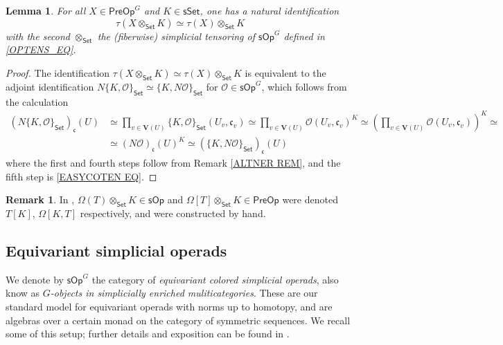 \documentclass[a4paper,10pt
,draft
]{article}%
\numberwithin{equation}{section}
\numberwithin{figure}{section}
\newtheorem{lemma}[equation]{Lemma}%
\theoremstyle{definition} %
\newtheorem{remark}[equation]{Remark}%
\newcommand{\sSet}{\ensuremath{\mathsf{sSet}}}%
\newcommand{\sOp}{\ensuremath{\mathsf{sOp}}}%
\renewcommand{\O}{\ensuremath{\mathcal O}}
\newcommand{\1}{\ensuremath{\mathbbm 1}}%
\begin{document}
\begin{lemma}\label{TAUOTIMES_LEM}
	For all $X \in \mathsf{PreOp}^G$ and $K \in \sSet$, 
	one has a natural identification
	\[\tau(X \otimes_{\mathsf{Set}} K) \simeq \tau(X) \otimes_{\mathsf{Set}} K\]
	with the second $\otimes_{\mathsf{Set}}$ the (fiberwise) simplicial tensoring of $\sOp^G$ defined in \eqref{OPTENS_EQ}.
\end{lemma}

\begin{proof}
	The identification
	$\tau(X \otimes_{\mathsf{Set}} K) \simeq \tau(X) \otimes_{\mathsf{Set}} K$
	is equivalent to the adjoint identification
	$
	N \{K,\O\}_{\mathsf{Set}}
	\simeq
	\{K,N \O\}_{\mathsf{Set}} 
	$
	for $\O \in \mathsf{sOp}^G$,
	which follows from the calculation
	\begin{equation}
	\begin{split}
	\left(N \{K,\O\}_{\mathsf{Set}}\right)_{\mathfrak{c}}(U)
	& \simeq
	\prod_{v \in \boldsymbol{V}(U)} 
	\{K,\O\}_{\mathsf{Set}}(U_v,\mathfrak{c}_v)
	\simeq
	\prod_{v \in \boldsymbol{V}(U)}
	\O(U_v,\mathfrak{c}_v)^K
	\simeq
	\left(\prod_{v \in \boldsymbol{V}(U)}
	\O(U_v,\mathfrak{c}_v)\right)^K
	\simeq 
	\\
	& \simeq
	\left(N \O\right)_{\mathfrak{c}}(U)^K
	\simeq
	\left(\{K,N \O\}_{\mathsf{Set}}\right)_{\mathfrak{c}}(U)
	\end{split}
	\end{equation}
	where the first and fourth steps follow from Remark \ref{ALTNER REM},
	and the fifth step is \eqref{EASYCOTEN EQ}.
\end{proof}



\begin{remark}
	In \cite[\S 7.1]{CM13b}, $\Omega(T) \otimes_{\mathsf{Set}} K \in \sOp$ and $\Omega[T] \otimes_{\mathsf{Set}} K \in \mathsf{PreOp}$ were denoted $T[K]$, $\Omega[K,T]$ respectively, and were constructed by hand.
\end{remark}



\subsection{Equivariant simplicial operads}
\label{GSOP_SEC}

We denote by $\mathsf{sOp}^G$ the category of \textit{equivariant colored simplicial operads}, also know as \textit{$G$-objects in simplicially enriched muliticategories}.
These are our standard model for equivariant operads with norms up to homotopy,
and are algebras over a certain monad on the category of symmetric sequences.
We recall some of this setup; further details and exposition can be found in \cite[\S 2]{BP_HGOP}.
\end{document}
